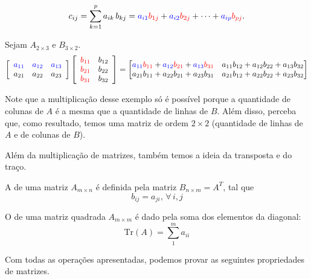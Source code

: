 \documentclass[../main.tex]{subfiles}
\begin{document}
		\[
		c_{ij}
		=
		\sum_{k=1}^{p} a_{ik}\,b_{kj}
		=
		{\color{blue}a_{i1}}{\color{red}b_{1j}}
		+{\color{blue}a_{i2}}{\color{red}b_{2j}}
		+\cdots
		+{\color{blue}a_{ip}}{\color{red}b_{pj}}.
		\]
		
		\begin{exemplo}
			Sejam $A_{2\times 3}$ e $B_{3\times 2}$. 
			\[
			\left[
			\begin{array}{ccc}
				\color{blue}a_{11} & \color{blue}a_{12} & \color{blue}a_{13}\\
				a_{21} & a_{22} & a_{23}
			\end{array}
			\right]
			\left[
			\begin{array}{>{\color{red}}c c}
				b_{11} & b_{12}\\
				b_{21} & b_{22}\\
				b_{31} & b_{32}
			\end{array}
			\right]
			=
			\begin{bmatrix}
				\cblue{a_{11}}\cred{b_{11}}+
				\cblue{a_{12}}\cred{b_{21}}+
				\cblue{a_{13}}\cred{b_{31}} & 
				{a_{11}}{b_{12}}+
				{a_{12}}{b_{22}}+
				{a_{13}}{b_{32}}
				\\
				{a_{21}}{b_{11}}+
				{a_{22}}{b_{21}}+
				{a_{23}}{b_{31}} &
				{a_{21}}{b_{12}}+
				{a_{22}}{b_{22}}+
				{a_{23}}{b_{32}}
			\end{bmatrix}
			\]
		\end{exemplo}
		Note que a multiplicação desse exemplo só é possível porque a quantidade de colunas de $A$ é a mesma que a quantidade de linhas de $B$. Além disso, perceba que, como resultado, temos uma matriz de ordem $2\times 2$ (quantidade de linhas de $A$ e de colunas de $B$).
		
		Além da multiplicação de matrizes, também temos a ideia da transposta e do traço.
		\begin{definicao}
			A  de uma matriz $A_{m\times n}$ é definida pela matriz $B_{n\times m}=A^T$, tal que
			\[
			b_{ij}=a_{ji},\, \forall\, i,j
			\]
		\end{definicao}
		\begin{definicao}
			O  de uma matriz quadrada $A_{m\times m}$ é dado pela soma dos elementos da diagonal:
			\[
			\text{Tr}(A)=\sum_{1}^{m} a_{ii}
			\]
		\end{definicao}
		
		Com todas as operações apresentadas, podemos provar as seguintes propriedades de matrizes.
		
\end{document}
